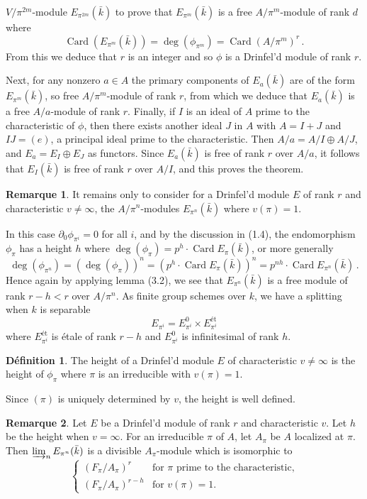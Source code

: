 \documentclass[12pt,a4paper]{article}
\theoremstyle{plain}
\theoremstyle{definition}
\newtheorem{definition}{D\'efinition}[section]
\newtheorem{remark}{Remarque}[section]
\theoremstyle{remark}
\DeclareMathOperator{\Card}{Card}
\begin{document}
\setcounter{section}{0}
\setcounter{page}{36}

$V/\pi^{2m}$-module $E_{\pi^{2m}}(\bar{k})$ to prove that $E_{\pi^m}(\bar{k})$ 
is a free $A/\pi^m$-module of rank $d$ where
\[
\Card(E_{\pi^m}(\bar{k})) = \deg(\phi_{\pi^m}) = \Card(A/\pi^m)^r \,.
\]
From this we deduce that $r$ is an integer and so $\phi$ is a Drinfel'd module 
of rank $r$.

Next, for any nonzero $a \in A$ the primary components of $E_a(\bar{k})$ are of 
the form $E_{\pi^m}(\bar{k})$, so free $A/\pi^m$-module of rank $r$, from which 
we deduce that $E_a(\bar{k})$ is a free $A/a$-module of rank $r$. Finally, if $I$ 
is an ideal of $A$ prime to the characteristic of $\phi$, then there exists 
another ideal $J$ in $A$ with $A = I + J$ and $IJ = (e)$, a principal ideal 
prime to the characteristic. Then $A/a = A/I \oplus A/J$, and 
$E_a = E_I \oplus E_J$ as functors. Since $E_a(\bar{k})$ is free of rank $r$ 
over $A/a$, it follows that $E_I(\bar{k})$ is free of rank $r$ over $A/I$, and 
this proves the theorem.

\begin{remark}
It remains only to consider for a Drinfel'd module $E$ of rank $r$ and 
characteristic $v \neq \infty$, the $A/\pi^n$-modules $E_{\pi^n}(\bar{k})$ where 
$v(\pi) = 1$.

In this case $\partial_0\phi_{\pi^i} = 0$ for all $i$, and by the discussion in 
(1.4), the endomorphism $\phi_\pi$ has a height $h$ where 
$\deg(\phi_\pi) = p^h \cdot \Card E_\pi(\bar{k})$, or more generally
\[
\deg(\phi_{\pi^n}) = (\deg(\phi_\pi))^n = (p^h \cdot \Card E_\pi(\bar{k}))^n 
= p^{nh} \cdot \Card E_{\pi^n}(\bar{k}) \,.
\]
Hence again by applying lemma (3.2), we see that $E_{\pi^n}(\bar{k})$ is a free 
module of rank $r - h < r$ over $A/\pi^n$. As finite group schemes over $k$, 
we have a splitting when $k$ is separable
\[
E_{\pi^i} = E_{\pi^i}^0 \times E_{\pi^i}^{\text{\'et}}
\]
where $E_{\pi^i}^{\text{\'et}}$ is \'etale of rank $r - h$ and 
$E_{\pi^i}^0$ is infinitesimal of rank $h$.
\end{remark}

\begin{definition}
The height of a Drinfel'd module $E$ of characteristic $v \neq \infty$ is the 
height of $\phi_\pi$ where $\pi$ is an irreducible with $v(\pi) = 1$.
\end{definition}

Since $(\pi)$ is uniquely determined by $v$, the height is well defined.

\begin{remark}
Let $E$ be a Drinfel'd module of rank $r$ and characteristic $v$. Let $h$ be 
the height when $v = \infty$. For an irreducible $\pi$ of $A$, let $A_\pi$ be 
$A$ localized at $\pi$. Then $\varinjlim_n E_{\pi^n}(\bar{k})$ is a divisible 
$A_\pi$-module which is isomorphic to
\[
\begin{cases}
(F_\pi/A_\pi)^r & \text{for $\pi$ prime to the characteristic,} \\[2mm]
(F_\pi/A_\pi)^{r-h} & \text{for $v(\pi) = 1$.}
\end{cases}
\]
\end{remark}
\end{document}
